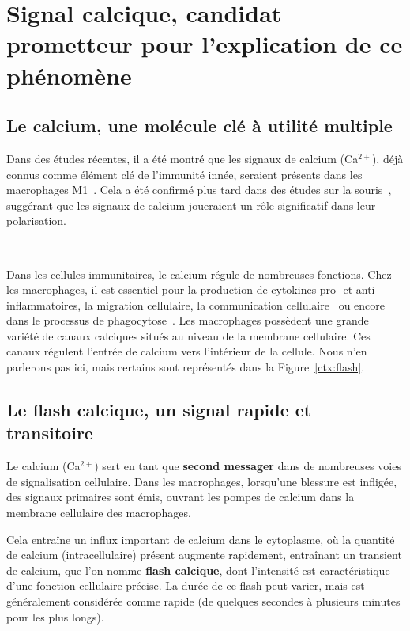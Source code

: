 \documentclass[a4paper,12pt]{report}
\newcommand{\figref}[1]{Figure~\ref{#1}}
\begin{document}
\section{Signal calcique, candidat prometteur pour l'explication de ce phénomène}

\subsection{Le calcium, une molécule clé à utilité multiple}


Dans des études récentes, il a été montré que les signaux de calcium (Ca$^{2+}$), déjà connus comme élément clé de l'immunité innée, seraient présents dans les macrophages M1~\cite{atcha}. Cela a été confirmé plus tard dans des études sur la souris~\cite{mehari,sipka}, suggérant que les signaux de calcium joueraient un rôle significatif dans leur polarisation.

\

Dans les cellules immunitaires, le calcium régule de nombreuses fonctions. Chez les macrophages, il est essentiel pour la production de cytokines pro- et anti-inflammatoires, la migration cellulaire, la communication cellulaire~\cite{taghdiri} ou encore dans le processus de phagocytose~\cite{nunes,watanabe,yan}. Les macrophages possèdent une grande variété de canaux calciques situés au niveau de la membrane cellulaire. Ces canaux régulent l'entrée de calcium vers l'intérieur de la cellule. Nous n'en parlerons pas ici, mais certains sont représentés dans la \figref{ctx:flash}.

\subsection{Le flash calcique, un signal rapide et transitoire}

Le calcium (Ca$^{2+}$) sert en tant que \textbf{second messager} dans de nombreuses voies de signalisation cellulaire. Dans les macrophages, lorsqu'une blessure est infligée, des signaux primaires sont émis, ouvrant les pompes de calcium dans la membrane cellulaire des macrophages.

Cela entraîne un influx important de calcium dans le cytoplasme, où la quantité de calcium (intracellulaire) présent augmente rapidement, entraînant un transient de calcium, que l'on nomme \textbf{flash calcique}, dont l'intensité est caractéristique d'une fonction cellulaire précise. La durée de ce flash peut varier, mais est généralement considérée comme rapide (de quelques secondes à plusieurs minutes pour les plus longs).
\end{document}
